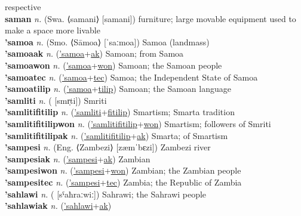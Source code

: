 respective \label{samalon} \\
\textbf{saman} \textit{n.} (Swa. ⟨samani⟩ [samani])
furniture; large movable equipment used to make a space more livable \label{saman} \\
\textbf{'samoa} \textit{n.} (Smo. ⟨Sāmoa⟩ [ˈsaːmoa])
Samoa (landmass) \label{'samoa} \\
\textbf{'samoaak} \textit{n.} (\hyperref['samoa]{'samoa}+\hyperref[ak]{ak})
Samoan; from Samoa \label{'samoaak} \\
\textbf{'samoawon} \textit{n.} (\hyperref['samoa]{'samoa}+\hyperref[won]{won})
Samoan; the Samoan people \label{'samoawon} \\
\textbf{'samoatec} \textit{n.} (\hyperref['samoa]{'samoa}+\hyperref[tec]{tec})
Samoa; the Independent State of Samoa \label{'samoatec} \\
\textbf{'samoatilip} \textit{n.} (\hyperref['samoa]{'samoa}+\hyperref[tilip]{tilip})
Samoan; the Samoan language \label{'samoatilip} \\
\textbf{'samliti} \textit{n.} ( [smr̩ti])
Smriti \label{'samliti} \\
\textbf{'samlitifitilip} \textit{n.} (\hyperref['samliti]{'samliti}+\hyperref[fitilip]{fitilip})
Smartism; Smarta tradition \label{'samlitifitilip} \\
\textbf{'samlitifitilipwon} \textit{n.} (\hyperref['samlitifitilip]{'samlitifitilip}+\hyperref[won]{won})
Smartism; followers of Smriti \label{'samlitifitilipwon} \\
\textbf{'samlitifitilipak} \textit{n.} (\hyperref['samlitifitilip]{'samlitifitilip}+\hyperref[ak]{ak})
Smarta; of Smartism \label{'samlitifitilipak} \\
\textbf{'sampesi} \textit{n.} (Eng. ⟨Zambezi⟩ [zæmˈbɛzi])
Zambezi river \label{'sampesi} \\
\textbf{'sampesiak} \textit{n.} (\hyperref['sampesi]{'sampesi}+\hyperref[ak]{ak})
Zambian \label{'sampesiak} \\
\textbf{'sampesiwon} \textit{n.} (\hyperref['sampesi]{'sampesi}+\hyperref[won]{won})
Zambian; the Zambian people \label{'sampesiwon} \\
\textbf{'sampesitec} \textit{n.} (\hyperref['sampesi]{'sampesi}+\hyperref[tec]{tec})
Zambia; the Republic of Zambia \label{'sampesitec} \\
\textbf{'sahlawi} \textit{n.} ( [sˤaħraːwiː])
Sahrawi; the Sahrawi people \label{'sahlawi} \\
\textbf{'sahlawiak} \textit{n.} (\hyperref['sahlawi]{'sahlawi}+\hyperref[ak]{ak})
